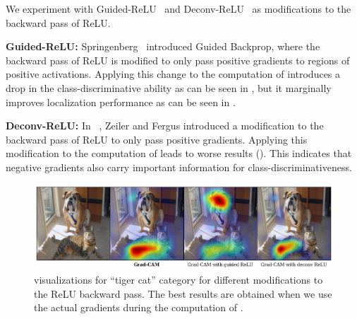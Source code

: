 We experiment with Guided-ReLU~\cite{springenberg_arxiv14} and Deconv-ReLU~\cite{zeiler_eccv14}
as modifications to the backward pass of ReLU.

\textbf{Guided-ReLU:} Springenberg~\etal\cite{springenberg_arxiv14} introduced Guided Backprop,
where the backward pass of ReLU is modified to only pass positive gradients
to regions of positive activations.
Applying this change to the computation of \gcam{} introduces a drop in the
class-discriminative ability as can be seen in ,
but it marginally improves localization performance as can be seen in .

\textbf{Deconv-ReLU:} In \dec{}~\cite{zeiler_eccv14}, Zeiler and Fergus introduced a
modification to the backward pass of ReLU to only pass positive gradients.
Applying this modification to the computation of \gcam{} leads to worse results
(). This indicates that negative gradients also carry
important information for class-discriminativeness.



\begin{figure}[h]

     \centering
     \includegraphics[width=1\linewidth]{figures/gcam_ablation_guided_deconv_ReLU.jpg}
     \caption{\gcam{} visualizations for ``tiger cat'' category for different modifications to the ReLU backward pass. The best results are obtained when we use the actual gradients during the computation of \gcam{}.}
     \label{fig:relu}
   \end{figure}



